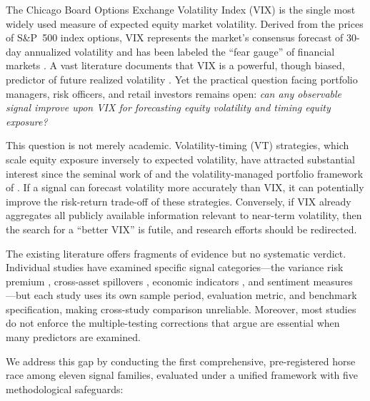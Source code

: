 \documentclass[12pt,a4paper]{article}
\begin{document}
The Chicago Board Options Exchange Volatility Index (VIX) is the single most widely used measure of expected equity market volatility. Derived from the prices of S\&P~500 index options, VIX represents the market's consensus forecast of 30-day annualized volatility and has been labeled the ``fear gauge'' of financial markets \citep{whaley2000}. A vast literature documents that VIX is a powerful, though biased, predictor of future realized volatility \citep{christensen1998, jiang2005, bekaert2014}. Yet the practical question facing portfolio managers, risk officers, and retail investors remains open: \emph{can any observable signal improve upon VIX for forecasting equity volatility and timing equity exposure?}

This question is not merely academic. Volatility-timing (VT) strategies, which scale equity exposure inversely to expected volatility, have attracted substantial interest since the seminal work of \citet{fleming2001} and the volatility-managed portfolio framework of \citet{moreira2017}. If a signal can forecast volatility more accurately than VIX, it can potentially improve the risk-return trade-off of these strategies. Conversely, if VIX already aggregates all publicly available information relevant to near-term volatility, then the search for a ``better VIX'' is futile, and research efforts should be redirected.

The existing literature offers fragments of evidence but no systematic verdict. Individual studies have examined specific signal categories---the variance risk premium \citep{bollerslev2009}, cross-asset spillovers \citep{diebold2012}, economic indicators \citep{schwert1989}, and sentiment measures \citep{baker2006}---but each study uses its own sample period, evaluation metric, and benchmark specification, making cross-study comparison unreliable. Moreover, most studies do not enforce the multiple-testing corrections that \citet{harvey2016} argue are essential when many predictors are examined.

We address this gap by conducting the first comprehensive, pre-registered horse race among eleven signal families, evaluated under a unified framework with five methodological safeguards:
\end{document}
